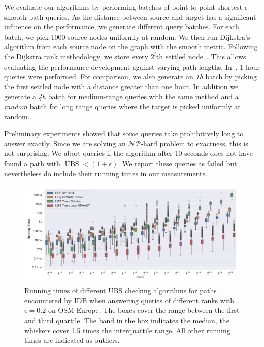 \documentclass[a4paper,UKenglish,cleveref, autoref, thm-restate]{lipics-v2021}
\newcommand*{\ubs}{\operatorname{UBS}}
\begin{document}
We evaluate our algorithms by performing batches of point-to-point shortest $\epsilon$-smooth path queries.
As the distance between source and target has a significant influence on the performance, we generate different query batches.
For each batch, we pick 1000 source nodes uniformly at random.
We then run Dijkstra's algorithm from each source node on the graph with the smooth metric.
Following the Dijkstra rank methodology, we store every $2^i$th settled node~\cite{ss-hhhes-05}.
This allows evaluating the performance development against varying path lengths.
In~\cite{adgw-arrn-13}, 1-hour queries were performed.
For comparison, we also generate an \emph{1h} batch by picking the first settled node with a distance greater than one hour.
In addition we generate a \emph{4h} batch for medium-range queries with the same method and a \emph{random} batch for long range queries where the target is picked uniformly at random.

Preliminary experiments showed that some queries take prohibitively long to answer exactly.
Since we are solving an $\mathcal{NP}$-hard problem to exactness, this is not surprising.
We abort queries if the algorithm after 10 seconds does not have found a path with $\ubs < (1+\epsilon)$.
We report these queries as failed but nevertheless do include their running times in our measurements.

\begin{figure}
\centering
\includegraphics[width=\linewidth]{fig/ubs_perf.pdf}
\caption{
Running times of different UBS checking algorithms for paths encountered by IDB when answering queries of different ranks with $\epsilon = 0.2$ on OSM Europe.
The boxes cover the range between the first and third quartile.
The band in the box indicates the median, the whiskers cover 1.5 times the interquartile range.
All other running times are indicated as outliers.
}\label{fig:ubs_perf}
\end{figure}
\end{document}
